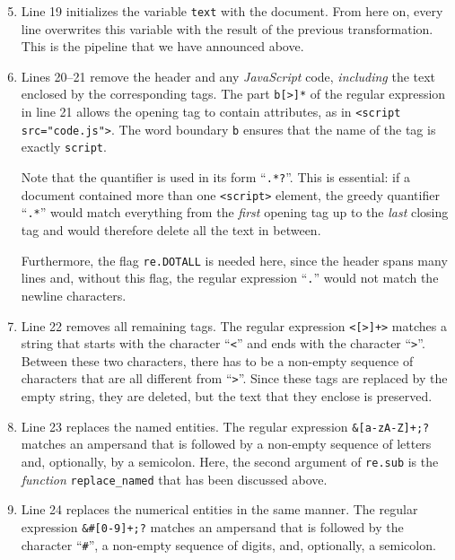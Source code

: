 \begin{enumerate}
\setcounter{enumi}{4}
\item Line 19 initializes the variable \texttt{text} with the  document.  From here on, every
      line overwrites this variable with the result of the previous transformation.  This is the pipeline that
      we have announced above.
\item Lines 20--21 remove the header and any \textsl{JavaScript} code, \emph{including} the text enclosed by the
      corresponding tags.  The part \texttt{b[>]*} of the regular expression in line 21
      allows the opening tag to contain attributes, as in \texttt{<script src="code.js">}.  The word boundary
      \texttt{b} ensures that the name of the tag is exactly \texttt{script}.

      Note that the quantifier is used in its  form ``\texttt{.*?}''.  This is essential: if a
      document contained more than one \texttt{<script>} element, the greedy quantifier ``\texttt{.*}'' would
      match everything from the \emph{first} opening tag up to the \emph{last} closing tag and would therefore
      delete all the text in between.

      Furthermore, the flag \texttt{re.DOTALL} is needed here, since the header spans many lines and, without
      this flag, the regular expression ``\texttt{.}'' would not match the newline characters.
\item Line 22 removes all remaining tags.  The regular expression \texttt{<[>]+>} matches a string
      that starts with the character ``\texttt{<}'' and ends with the character ``\texttt{>}''.  Between these
      two characters, there has to be a non-empty sequence of characters that are all different from
      ``\texttt{>}''.  Since these tags are replaced by the empty string, they are deleted, but the text that
      they enclose is preserved.
\item Line 23 replaces the named entities.  The regular expression \texttt{\&[a-zA-Z]+;?} matches an ampersand
      that is followed by a non-empty sequence of letters and, optionally, by a semicolon.  Here, the second
      argument of \texttt{re.sub} is the \emph{function} \texttt{replace\_named} that has been discussed above.
\item Line 24 replaces the numerical entities in the same manner.  The regular expression
      \texttt{\&\#[0-9]+;?} matches an ampersand that is followed by the character ``\texttt{\#}'', a non-empty
      sequence of digits, and, optionally, a semicolon.


\end{enumerate}
